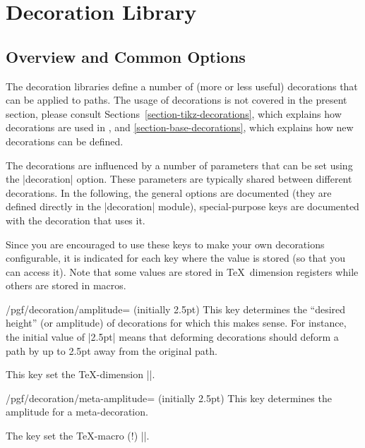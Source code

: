 %
%
%

\section{Decoration Library}
\label{section-library-decorations}



\subsection{Overview and Common Options}

The decoration libraries define a number of (more or less useful)
decorations that can be applied to paths. The usage of decorations is
not covered in the present section, please consult 
Sections~\ref{section-tikz-decorations}, which explains how
decorations are used in \tikzname, and
\ref{section-base-decorations}, which  explains how new
decorations can be defined. 

The decorations are influenced by a number of parameters that can be
set using the |decoration| option. These parameters are
typically shared between different decorations. In the following, the
general options are documented (they are defined directly in the
|decoration| module), special-purpose keys are documented
with the decoration that uses it.

Since you are encouraged to use these keys to make your own
decorations configurable, it is indicated for each key where the value
is stored (so that you can access it). Note that some values are
stored in \TeX\ dimension registers while others are stored in macros.

\begin{key}{/pgf/decoration/amplitude= (initially 2.5pt)}
  This key determines the ``desired height'' (or amplitude) of 
  decorations for which this makes sense. For instance, the initial
  value of |2.5pt| means that deforming decorations should deform a
  path by up to 2.5pt away from the original path.

  This key set the \TeX-dimension |\pgfdecorationsegmentamplitude|. 
\end{key}

\begin{key}{/pgf/decoration/meta-amplitude= (initially 2.5pt)}
  This key determines the amplitude for a meta-decoration. 

  The key set the \TeX-macro (!) |\pgfmetadecorationsegmentamplitude|.
\end{key}


